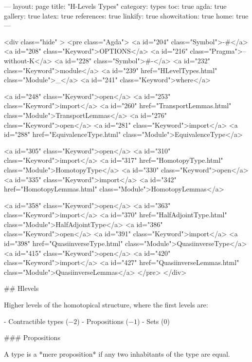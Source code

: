 ---
layout: page
title: "H-Levels Types"
category: types
toc: true
agda: true
gallery: true
latex: true
references: true
linkify: true
showcitation: true
home: true
---

<div class="hide" >
<pre class="Agda">
<a id="204" class="Symbol">{-#</a> <a id="208" class="Keyword">OPTIONS</a> <a id="216" class="Pragma">--without-K</a> <a id="228" class="Symbol">#-}</a>
<a id="232" class="Keyword">module</a> <a id="239" href="HLevelTypes.html" class="Module">_</a> <a id="241" class="Keyword">where</a>

<a id="248" class="Keyword">open</a> <a id="253" class="Keyword">import</a> <a id="260" href="TransportLemmas.html" class="Module">TransportLemmas</a>
<a id="276" class="Keyword">open</a> <a id="281" class="Keyword">import</a> <a id="288" href="EquivalenceType.html" class="Module">EquivalenceType</a>

<a id="305" class="Keyword">open</a> <a id="310" class="Keyword">import</a> <a id="317" href="HomotopyType.html" class="Module">HomotopyType</a>
<a id="330" class="Keyword">open</a> <a id="335" class="Keyword">import</a> <a id="342" href="HomotopyLemmas.html" class="Module">HomotopyLemmas</a>

<a id="358" class="Keyword">open</a> <a id="363" class="Keyword">import</a> <a id="370" href="HalfAdjointType.html" class="Module">HalfAdjointType</a>
<a id="386" class="Keyword">open</a> <a id="391" class="Keyword">import</a> <a id="398" href="QuasiinverseType.html" class="Module">QuasiinverseType</a>
<a id="415" class="Keyword">open</a> <a id="420" class="Keyword">import</a> <a id="427" href="QuasiinverseLemmas.html" class="Module">QuasiinverseLemmas</a>
</pre>
</div>


## Hlevels

Higher levels of the homotopical structure, where the
first levels are:

- Contractible types ($-2$)
- Propositions ($-1$)
- Sets ($0$)

### Propositions


A type is a *mere proposition* if any two inhabitants of the type are equal.


